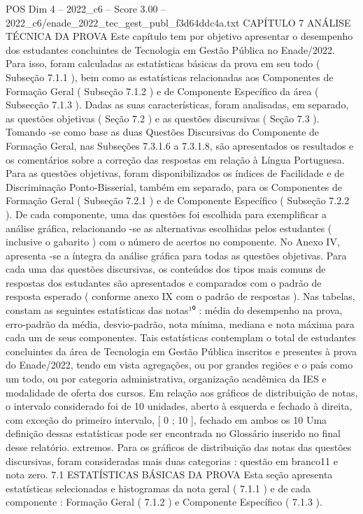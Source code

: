 \begin{textsample}{POS Dim 4 – 2022\_c6 – Score 3.00 – 2022\_c6/enade\_2022\_tec\_gest\_publ\_f3d64ddc4a.txt}  \label{ex:f4_pos_087}
CAPÍTULO 7 ANÁLISE TÉCNICA DA PROVA Este capítulo tem por objetivo apresentar o desempenho dos estudantes concluintes de Tecnologia em Gestão Pública no Enade/2022.
Para isso, foram calculadas as estatísticas básicas da prova em seu todo ( Subseção 7.1.1 ), bem como as estatísticas relacionadas aos Componentes de Formação Geral ( Subseção 7.1.2 ) e de Componente Específico da área ( Subsecção 7.1.3 ).
Dadas as suas características, foram analisadas, em separado, as questões objetivas ( Seção 7.2 ) e as questões discursivas ( Seção 7.3 ).
Tomando -se como base as duas Questões Discursivas do Componente de Formação Geral, nas Subseções 7.3.1.6 a 7.3.1.8, são apresentados os resultados e os comentários sobre a correção das respostas em relação à Língua Portuguesa.
Para as questões objetivas, foram disponibilizados os índices de Facilidade e de Discriminação Ponto-Bisserial, também em separado, para os Componentes de Formação Geral ( Subseção 7.2.1 ) e de Componente Específico ( Subseção 7.2.2 ).
De cada componente, uma das questões foi escolhida para exemplificar a análise gráfica, relacionando -se as alternativas escolhidas pelos estudantes ( inclusive o gabarito ) com o número de acertos no componente.
No Anexo IV, apresenta -se a íntegra da análise gráfica para todas as questões objetivas.
Para cada uma das questões discursivas, os conteúdos dos tipos mais comuns de respostas dos estudantes são apresentados e comparados com o padrão de resposta esperado ( conforme anexo IX com o padrão de respostas ).
Nas tabelas, constam as seguintes estatísticas das notas¹⁰ : média do desempenho na prova, erro-padrão da média, desvio-padrão, nota mínima, mediana e nota máxima para cada um de seus componentes.
Tais estatísticas contemplam o total de estudantes concluintes da área de Tecnologia em Gestão Pública inscritos e presentes à prova do Enade/2022, tendo em vista agregações, ou por grandes regiões e o país como um todo, ou por categoria administrativa, organização acadêmica da IES e modalidade de oferta dos cursos.
Em relação aos gráficos de distribuição de notas, o intervalo considerado foi de 10 unidades, aberto à esquerda e fechado à direita, com exceção do primeiro intervalo, [ 0 ; 10 ], fechado em ambos os 10 Uma definição dessas estatísticas pode ser encontrada no Glossário inserido no final desse relatório. extremos.
Para os gráficos de distribuição das notas das questões discursivas, foram consideradas mais duas categorias : questão em branco11 e nota zero. 7.1 ESTATÍSTICAS BÁSICAS DA PROVA Esta seção apresenta estatísticas selecionadas e histogramas da nota geral ( 7.1.1 ) e de cada componente : Formação Geral ( 7.1.2 ) e Componente Específico ( 7.1.3 ).

\end{textsample}
